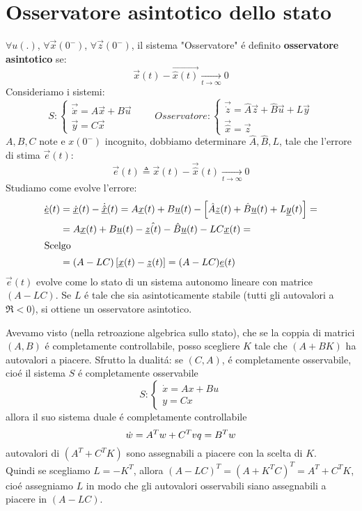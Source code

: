 \documentclass[../main.tex]{subfiles}
\begin{document}
	\section{Osservatore asintotico dello stato}
		$ \forall u(.) $, $ \forall \vec x(0^{-}) $, $ \forall \vec z(0^{-}) $, il sistema "Osservatore" \'e definito \textbf{osservatore asintotico} se:
		\[
			\vec x(t) - \vec{\hat x(t)} \underset{t \rightarrow \infty}{\longrightarrow} 0
		\]
		Consideriamo i sistemi:
		\[
			S:
			\begin{cases}
				\vec{\dot x} = A \vec x + B \vec u\\
				\vec y = C \vec x
			\end{cases}
			\qquad
			Osservatore:
			\begin{cases}
				\vec{\dot z} = \hat A \vec z + \hat B \vec u + L \vec y\\
				\vec{\hat x} = \vec z
			\end{cases}
		\]
		$ A, B, C $ note e $ x(0^{-}) $ incognito, dobbiamo determinare $ \hat A, \hat B, L $, tale che l'errore di stima $ \vec e(t) $:
		\[
			\vec e(t) \triangleq \vec x(t) - \vec{\hat x}(t) \underset{t \rightarrow \infty}{\longrightarrow} 0
		\]
		Studiamo come evolve l'errore:
		\begin{align*}
			\dot{\vec e}(t) &= \vec{\dot x}(t) - \dot{\vec{\hat{x}}}(t) = A \vec x(t) + B \vec u(t) - \left[ \hat A \vec z(t) + \hat B \vec u(t) + L \vec y(t) \right] =
			\\
			&= A \vec x(t) + B \vec u(t) - \hat{\vec z(t)} - \hat B \vec u(t) - LC \vec x(t) =
			\\\intertext{Scelgo}
			&= (A-LC) \left[ \vec x(t) - \vec z(t) \right] = (A-LC) \vec e(t)			
		\end{align*}
		$ \vec e(t) $ evolve come lo stato di un sistema autonomo lineare con matrice $ (A-LC) $. Se $ L $ \'e tale che sia asintoticamente stabile (tutti gli autovalori a $ \Re < 0 $), si ottiene un osservatore asintotico.
		
		Avevamo visto (nella retroazione algebrica sullo stato), che se la coppia di matrici $ (A,B) $ \'e completamente controllabile, posso scegliere $ K $ tale che $ (A+BK) $ ha autovalori a piacere. Sfrutto la dualit\'a: se $ (C,A) $, \'e completamente osservabile, cio\'e il sistema $ S $ \'e completamente osservabile
		\[
			S:
			\begin{cases}
				\dot x = Ax + Bu\\
				y = Cx
			\end{cases}
		\]
		allora il suo sistema duale \'e completamente controllabile
		\[
			\dot w = A^T w + C^T v\\
			q = B^T w
		\]
		autovalori di $ (A^T + C^T K) $ sono assegnabili a piacere con la scelta di $ K $.\\
		Quindi se scegliamo $ L = -K^T $, allora $ (A-LC)^T = (A+K^TC)^T = A^T + C^TK $, cio\'e assegniamo $ L $ in modo che gli autovalori osservabili siano assegnabili a piacere in $ (A-LC) $.
		
\end{document}
